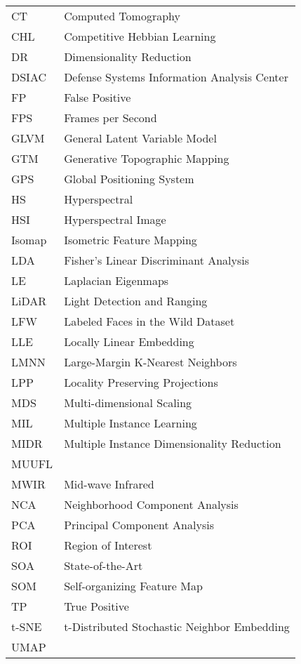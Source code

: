 \begin{tabular}{l p{5in}} %

CT & Computed Tomography\\
CHL & Competitive Hebbian Learning\\
DR & Dimensionality Reduction\\
DSIAC & Defense Systems Information Analysis Center\\
FP & False Positive\\ 
FPS & Frames per Second\\
GLVM & General Latent Variable Model\\
GTM & Generative Topographic Mapping\\
GPS & Global Positioning System\\
HS & Hyperspectral\\
HSI & Hyperspectral Image\\
Isomap & Isometric Feature Mapping\\
LDA & Fisher's Linear Discriminant Analysis\\
LE & Laplacian Eigenmaps\\
LiDAR & Light Detection and Ranging\\
LFW & Labeled Faces in the Wild Dataset\\
LLE & Locally Linear Embedding\\
LMNN & Large-Margin K-Nearest Neighbors\\
LPP & Locality Preserving Projections\\
MDS & Multi-dimensional Scaling\\
MIL & Multiple Instance Learning\\
MIDR & Multiple Instance Dimensionality Reduction\\
MUUFL & \\
MWIR & Mid-wave Infrared\\
NCA & Neighborhood Component Analysis\\
PCA & Principal Component Analysis\\
ROI & Region of Interest\\
SOA & State-of-the-Art\\
SOM & Self-organizing Feature Map\\
TP & True Positive\\
t-SNE & t-Distributed Stochastic Neighbor Embedding\\
UMAP & \\

 \end{tabular}



\doublespacing

